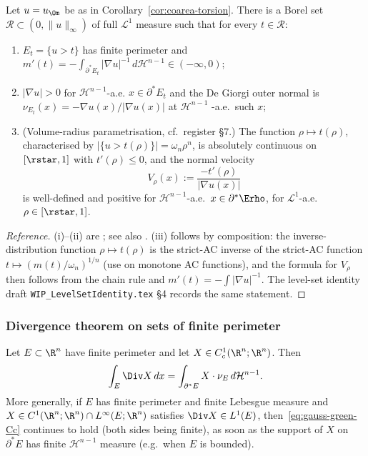 \begin{theorem}
\label{thm:sobolev-sard}
Let $u=u_\Om$ be as in Corollary~\ref{cor:coarea-torsion}.  There is a
Borel set $\mathcal R\subset(0,\|u\|_\infty)$ of full $\mathcal L^1$
measure such that for every $t\in\mathcal R$:
\begin{enumerate}
   \item[(i)] $E_t=\{u>t\}$ has finite perimeter and
       $m'(t)=-\int_{\partial^*E_t}|\nabla u|^{-1}\,d\mathcal H^{n-1}
        \in(-\infty,0)$;
   \item[(ii)] $|\nabla u|>0$ for $\mathcal H^{n-1}$-a.e.
       $x\in\partial^*E_t$ and the De Giorgi outer normal is
       $\nu_{E_t}(x)=-\nabla u(x)/|\nabla u(x)|$ at $\mathcal H^{n-1}$
       -a.e.\ such $x$;
   \item[(iii)] (Volume-radius parametrisation,
       cf.\ register \S 7.)  The function
       $\rho\mapsto t(\rho)$, characterised by
       $|\{u>t(\rho)\}|=\omega_n\rho^n$, is absolutely continuous on
       $[\rstar,1]$ with $t'(\rho)\le0$, and the normal velocity
       \[
          V_\rho(x):=\frac{-t'(\rho)}{|\nabla u(x)|}
       \]
       is well-defined and positive for $\mathcal H^{n-1}$-a.e.\
       $x\in\partial^*\Erho$, for $\mathcal L^1$-a.e.\
       $\rho\in[\rstar,1]$.
\end{enumerate}
\end{theorem}

\begin{proof}[Reference]
(i)--(ii) are \cite[App.~A, Thm.~A.1]{FigalliMaggi2011}; see also
\cite[Lem.~17.1]{Maggi2012}.  (iii) follows by composition: the
inverse-distribution function $\rho\mapsto t(\rho)$ is the strict-AC
inverse of the strict-AC function $t\mapsto (m(t)/\omega_n)^{1/n}$
(use \cite[Thm.~3.99]{AFP2000} on monotone AC functions), and the
formula for $V_\rho$ then follows from the chain rule and
$m'(t)=-\int|\nabla u|^{-1}$.  The level-set identity draft
\texttt{WIP\_LevelSetIdentity.tex} \S 4 records the same statement.
\end{proof}

\subsubsection{Divergence theorem on sets of finite perimeter}
\label{ssec:div-thm}

\begin{theorem}
\label{thm:gauss-green}
Let $E\subset\R^n$ have finite perimeter and let
$X\in C^1_c(\R^n;\R^n)$.  Then
\begin{equation}\label{eq:gauss-green-Cc}
   \int_E \Div X\,dx
   =\int_{\partial^*E}X\cdot\nu_E\,d\mathcal H^{n-1}.
\end{equation}
More generally, if $E$ has finite perimeter and finite Lebesgue
measure and $X\in C^1(\R^n;\R^n)\cap L^\infty(E;\R^n)$ satisfies
$\Div X\in L^1(E)$, then~\eqref{eq:gauss-green-Cc} continues to hold
(both sides being finite), as soon as the support of $X$ on
$\partial^*E$ has finite $\mathcal H^{n-1}$ measure (e.g.\ when $E$
is bounded).
\end{theorem}

